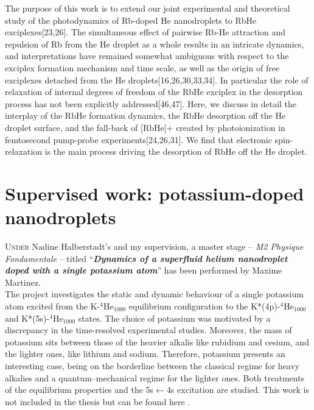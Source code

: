 		The purpose of this work is to extend our joint experimental and theoretical study of the photodynamics of Rb-doped He nanodroplets to RbHe exciplexes[23,26]. The simultaneous effect of pairwise Rb-He attraction and repulsion of Rb from the He droplet as a whole results in an intricate dynamics, and interpretations have remained somewhat ambiguous with respect to the exciplex formation mechanism and time scale, as well as the origin of free exciplexes detached from the He droplets[16,26,30,33,34]. In particular the role of relaxation of internal degrees of freedom of the RbHe exciplex in the desorption process has not been explicitly addressed[46,47]. Here, we discuss in detail the interplay of the RbHe formation dynamics, the RbHe desorption off the He droplet surface, and the fall-back of [RbHe]+ created by photoionization in femtosecond pump-probe experiments[24,26,31]. We find that electronic spin-relaxation is the main process driving the desorption of RbHe off the He droplet.
		
	\section{Supervised work: potassium-doped\\nanodroplets}
		\lettrine[lines=3,findent=3pt,nindent=0pt]{U}{nder} Nadine Halberstadt's and my supervision, a master stage -- \emph{M2 Physique Fondamentale} -- titled ``\emph{\textbf{Dynamics of a superfluid helium nanodroplet doped with a single potassium atom}}'' has been performed by Maxime Martinez.\\
		
		The project investigates the static and dynamic behaviour of a single potassium atom excited from the K-$^4$He$_{1000}$ equilibrium configuration to the K*(4p)-$^4$He$_{1000}$ and K*(5s)-$^4$He$_{1000}$ states. The choice of potassium was motivated by a discrepancy in the time-resolved experimental studies\citep{Schulz2001,Reho2000-1,Reho2000-2}. Moreover, the mass of potassium sits between those of the heavier alkalis like rubidium and cesium, and the lighter ones, like lithium and sodium. Therefore, potassium presents an interesting case, being on the borderline between the classical regime for heavy alkalies and a quantum--mechanical regime for the lighter ones. Both treatments of the equilibrium properties and the 5s$\leftarrow$4s excitation are studied. This work is not included in the thesis but can be found here \citep{Martinez2017}.